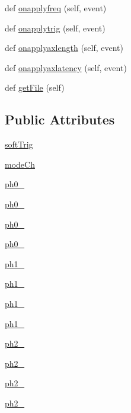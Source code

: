 \begin{DoxyCompactItemize}
def \hyperlink{classProtoFEB__v1_1_1ProtoFEB__v1_ac654ad0cdb32adcdb9a649ead2473739}{onapplyfreq} (self, event)
\item 
def \hyperlink{classProtoFEB__v1_1_1ProtoFEB__v1_a5108ef129a2d3cf2415489db2b8ca0ed}{onapplytrig} (self, event)
\item 
def \hyperlink{classProtoFEB__v1_1_1ProtoFEB__v1_a3f04a3f93366082ad95de91d1457fdf5}{onapplyaxlength} (self, event)
\item 
def \hyperlink{classProtoFEB__v1_1_1ProtoFEB__v1_a99efa326b380d20b35277081583d7e1f}{onapplyaxlatency} (self, event)
\item 
def \hyperlink{classProtoFEB__v1_1_1ProtoFEB__v1_a1c733a344ce1755bbffeec01dc3c9846}{get\+File} (self)
\end{DoxyCompactItemize}
\subsection*{Public Attributes}
\begin{DoxyCompactItemize}
\item 
\hyperlink{classProtoFEB__v1_1_1ProtoFEB__v1_ad7ba35e015e88cd43cad53cd547c3183}{soft\+Trig}
\item 
\hyperlink{classProtoFEB__v1_1_1ProtoFEB__v1_acd03f62f5c3c9829f4f0c7407735e352}{mode\+Ch}
\item 
\hyperlink{classProtoFEB__v1_1_1ProtoFEB__v1_ad56c4acc735e7ed9adb2ceaae9b49967}{ph0\+\_}
\item 
\hyperlink{classProtoFEB__v1_1_1ProtoFEB__v1_a5df64173851dcb2336e8d1945395e18b}{ph0\+\_}
\item 
\hyperlink{classProtoFEB__v1_1_1ProtoFEB__v1_a11f3b349eff03ea1c92ee05250b3d90a}{ph0\+\_}
\item 
\hyperlink{classProtoFEB__v1_1_1ProtoFEB__v1_a8be787a32630c27da6d2f8df2b8327b7}{ph0\+\_}
\item 
\hyperlink{classProtoFEB__v1_1_1ProtoFEB__v1_a833962f3b85e9c491848a4a64dde8f74}{ph1\+\_}
\item 
\hyperlink{classProtoFEB__v1_1_1ProtoFEB__v1_a9bb0c9261386773dd989beaf53de4d8a}{ph1\+\_}
\item 
\hyperlink{classProtoFEB__v1_1_1ProtoFEB__v1_a7d1308870c80a521331a1a0fdd5c8146}{ph1\+\_}
\item 
\hyperlink{classProtoFEB__v1_1_1ProtoFEB__v1_ae339986ae050d7709b091d38120f2c80}{ph1\+\_}
\item 
\hyperlink{classProtoFEB__v1_1_1ProtoFEB__v1_a8b6ff4697318f769fa262a5b5e4337d7}{ph2\+\_}
\item 
\hyperlink{classProtoFEB__v1_1_1ProtoFEB__v1_a6995895b0ffb6616f91a016d03667417}{ph2\+\_}
\item 
\hyperlink{classProtoFEB__v1_1_1ProtoFEB__v1_a28e21b4f4ad3988f2bed8299a80be79a}{ph2\+\_}
\item 
\hyperlink{classProtoFEB__v1_1_1ProtoFEB__v1_acb94f3e4d4d4011dd262ebe2e98ecff4}{ph2\+\_}
\end{DoxyCompactItemize}
